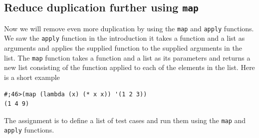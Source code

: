 \documentclass[12pt,a4paper,english,twoside]{article}
\begin{document}
\subsection{Reduce duplication further using \texttt{map}}
Now we will remove even more duplication by using the \texttt{map} and 
\texttt{apply} functions. We saw the \texttt{apply} function in the 
introduction it takes a function and a list as arguments and applies the 
supplied function to the supplied arguments in the list. The \texttt{map} 
function takes a function and a list as its parameters and returns a new list 
consisting of the function applied to each of the elements in the list.
Here is a short example
\begin{lstlisting}
#;46>(map (lambda (x) (* x x)) '(1 2 3))
(1 4 9)
\end{lstlisting}
The assignment is to define a list of test cases and run them using the 
\texttt{map} and \texttt{apply} functions.
\end{document}
